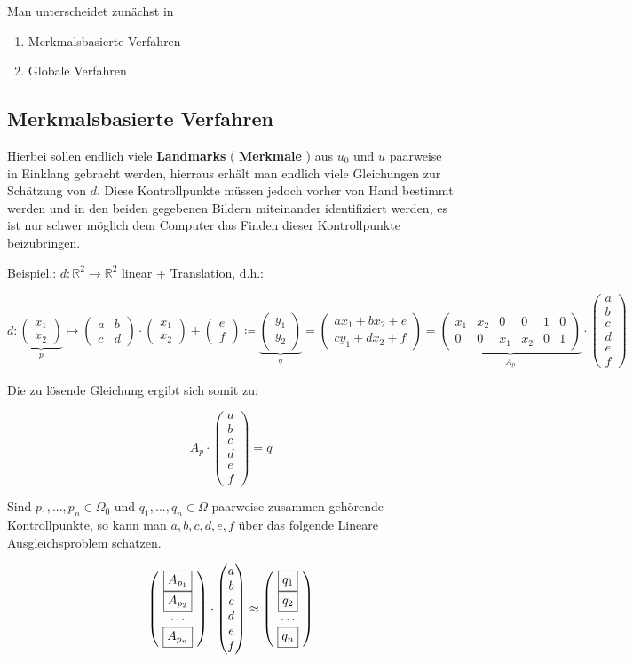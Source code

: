 \documentclass[ngerman]{article}
\theoremstyle{plain}
\theoremstyle{definition}
\numberwithin{equation}{section}
\newcommand{\R}[0] {
\mathbb R
}
\newcommand{\mim}[1] {
\underline{\textbf{#1\index{#1}}}
}
\newcommand{\C}[0]{
    \cdot
}
\newcommand{\mat}[1] {
\begin{pmatrix} #1 \end{pmatrix}
}
\begin{document}
Man unterscheidet zunächst in

\begin{enumerate}
    \item[\textbullet] Merkmalsbasierte Verfahren
    \item[\textbullet] Globale Verfahren
\end{enumerate}

\subsection{Merkmalsbasierte Verfahren}

Hierbei sollen endlich viele \mim{Landmarks}(\mim{Merkmale}) aus $u_0$ und $u$ paarweise in Einklang gebracht werden, hierraus erhält man endlich viele Gleichungen zur Schätzung von $d$. Diese Kontrollpunkte müssen jedoch vorher von Hand bestimmt werden und in den beiden gegebenen Bildern miteinander identifiziert werden, es ist nur schwer möglich dem Computer das Finden dieser Kontrollpunkte beizubringen.

Beispiel.: $d:\R^2 \to \R^2$ linear + Translation, d.h.:

\[ d:\underbrace{\mat{x_1 \\ x_2}}_{p} \mapsto \mat{a & b \\ c & d} \C \mat{x_1 \\ x_2}+ \mat{e\\f} \coloneqq \underbrace{\mat{y_1 \\ y_2}}_{q} = \mat{ax_1 + bx_2 +e\\ cy_1 + dx_2 + f} = \underbrace{\mat{x_1 & x_2 & 0 & 0 & 1 & 0\\ 0 & 0 & x_1 & x_2 & 0 & 1}}_{A_p}\C \mat{a\\b\\c\\d\\e\\f}\]

Die zu lösende Gleichung ergibt sich somit zu:

\[A_p \C \mat{a\\b\\c\\d\\e\\f} = q\]

Sind $p_1,...,p_n \in \Omega_0$ und $q_1,...,q_n \in \Omega$ paarweise zusammen gehörende Kontrollpunkte, so kann man $a,b,c,d,e,f$ über das folgende Lineare Ausgleichsproblem schätzen.

\[ \mat{\ \boxed{A_{p_1}} \ \\ \ \boxed{A_{p_2}} \ \\ \cdots \\ \ \boxed{A_{p_n}} \ } \C \mat{a\\b\\c\\d\\e\\f} \approx \mat{\ \boxed{q_1 \vphantom{A_{p_1}}} \ \\ \ \boxed{q_2 \vphantom{A_{p_1}}} \ \\ \cdots \\ \ \boxed{q_n \vphantom{A_{p_1}}} \ }\]
\end{document}
